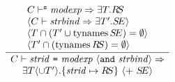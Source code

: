 
\begin{equation}                %
\label{strbinder-rule}
\frac{ \begin{array}{l}
       \C\ts^\expectstr\modexp\ra\exmod{\T}{\RS} \\
       \langle \C\ts\strbind\ra\EXISTS{\T'}{\SE} \rangle \\
       \langle \T \cap (\T' \cup \TyNamesFcn \SE) = \emptyset \rangle\\
       \langle \T' \cap (\TyNamesFcn \RS) = \emptyset \rangle
       \end{array}
     }
     {\begin{array}{c}
       \C\ts\strbinder\ra\\
         \EXISTS{\T\langle\cup\T'\rangle}
           {\{\strid\mapsto\RS\}\ \langle +\ \SE\rangle}
        \end{array} 
       }\index{41.1}
\end{equation}

